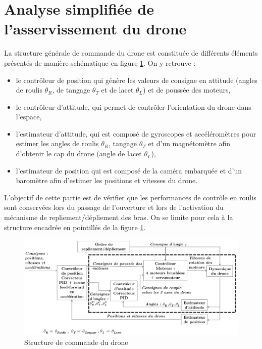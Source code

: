 \newpage

\section{Analyse simplifiée de l'asservissement du drone}

La structure générale de commande du drone est constituée de différents éléments présentés de manière schématique en figure \ref{fig15}. On y retrouve :
\begin{itemize}
 \item le contrôleur de position qui génère les valeurs de consigne en attitude (angles de roulis $\theta_R$, de tangage $\theta_T$ et de lacet $\theta_L$) et de poussée des moteurs,
 \item le contrôleur d'attitude, qui permet de contrôler l'orientation du drone dans l'espace,
 \item  l'estimateur d'attitude, qui est composé de gyroscopes et accéléromètres pour estimer les angles de roulis $\theta_R$, tangage $\theta_T$ et d'un magnétomètre afin d'obtenir le cap du drone (angle de lacet $\theta_L$),
 \item l'estimateur de position qui est composé de la caméra embarquée et d'un baromètre afin d'estimer les positions et vitesses du drone.
\end{itemize}

L'objectif de cette partie est de vérifier que les performances de contrôle en roulis sont conservées lors du passage de l'ouverture et lors de l'activation du mécanisme de repliement/dépliement des bras. On se limite pour cela à la structure encadrée en pointillés de la figure \ref{fig15}.

\begin{figure}[ht!]
\begin{center}
 \includegraphics[width=0.85\linewidth]{img/fig15}
\end{center}
\caption{\label{fig15} Structure de commande du drone}
\end{figure}

